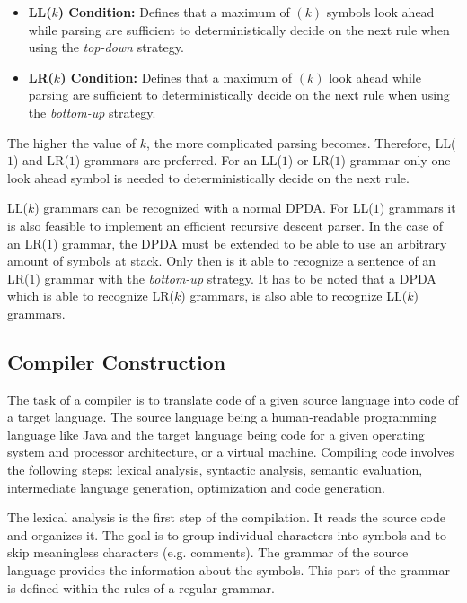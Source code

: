 \begin{itemize}
    \item \textbf{LL($k$) Condition:} Defines that a maximum of $(k)$ symbols look ahead while parsing are sufficient to deterministically decide on the next rule when using the \textit{top-down} strategy.
    \item \textbf{LR($k$) Condition:} Defines that a maximum of $(k)$ look ahead while parsing are sufficient to deterministically decide on the next rule when using the \textit{bottom-up} strategy.
\end{itemize}

The higher the value of $k$, the more complicated parsing becomes. Therefore, LL($1$) and LR($1$) grammars are preferred. For an LL($1$) or LR($1$) grammar only one look ahead symbol is needed to deterministically decide on the next rule. 

LL($k$) grammars can be recognized with a normal DPDA. For LL($1$) grammars it is also feasible to implement an efficient recursive descent parser. In the case of an LR($1$) grammar, the DPDA must be extended to be able to use an arbitrary amount of symbols at stack. Only then is it able to recognize a sentence of an LR($1$) grammar with the \textit{bottom-up} strategy. It has to be noted that a DPDA which is able to recognize LR($k$) grammars, is also able to recognize LL($k$) grammars.

\subsection{Compiler Construction}

The task of a compiler is to translate code of a given source language into code of a target language. The source language being a human-readable programming language like Java and the target language being code for a given operating system and processor architecture, or a virtual machine. Compiling code involves the following steps: lexical analysis, syntactic analysis, semantic evaluation, intermediate language generation, optimization and code generation.


The lexical analysis is the first step of the compilation. It reads the source code and organizes it. The goal is to group individual characters into symbols and to skip meaningless characters (e.g. comments). The grammar of the source language provides the information about the symbols. This part of the grammar is defined within the rules of a regular grammar. 

